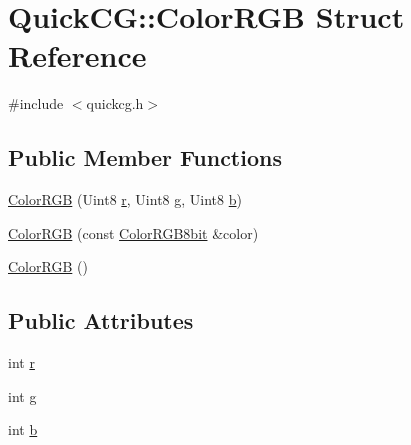 \hypertarget{structQuickCG_1_1ColorRGB}{\section{Quick\-C\-G\-:\-:Color\-R\-G\-B Struct Reference}
\label{structQuickCG_1_1ColorRGB}
}


{\ttfamily \#include $<$quickcg.\-h$>$}

\subsection*{Public Member Functions}
\begin{DoxyCompactItemize}
\item 
\hyperlink{structQuickCG_1_1ColorRGB_a4f9b2654955a752589ba46f02ce64d57}{Color\-R\-G\-B} (Uint8 \hyperlink{structQuickCG_1_1ColorRGB_a3873210b09a441c02ec224cfc49b8385}{r}, Uint8 \hyperlink{structQuickCG_1_1ColorRGB_af9d258f0404f8dc39677ccc6a474e36a}{g}, Uint8 \hyperlink{structQuickCG_1_1ColorRGB_ae85c3461b4eaed0bf2ccdf07f4bbedb4}{b})
\item 
\hyperlink{structQuickCG_1_1ColorRGB_a35046c5329affabfae8d491fda700916}{Color\-R\-G\-B} (const \hyperlink{structQuickCG_1_1ColorRGB8bit}{Color\-R\-G\-B8bit} \&color)
\item 
\hyperlink{structQuickCG_1_1ColorRGB_a5b4b7e30ad5f4daf9189354751058986}{Color\-R\-G\-B} ()
\end{DoxyCompactItemize}
\subsection*{Public Attributes}
\begin{DoxyCompactItemize}
\item 
int \hyperlink{structQuickCG_1_1ColorRGB_a3873210b09a441c02ec224cfc49b8385}{r}
\item 
int \hyperlink{structQuickCG_1_1ColorRGB_af9d258f0404f8dc39677ccc6a474e36a}{g}
\item 
int \hyperlink{structQuickCG_1_1ColorRGB_ae85c3461b4eaed0bf2ccdf07f4bbedb4}{b}
\end{DoxyCompactItemize}


